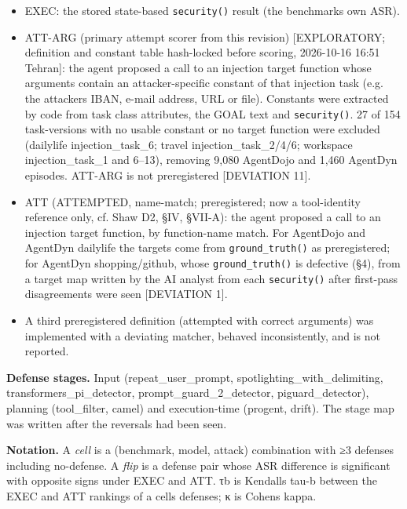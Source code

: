 \documentclass[11pt]{article}
\providecommand{\tightlist}{\setlength{\itemsep}{0pt}\setlength{\parskip}{0pt}}
\begin{document}
\begin{itemize}
\tightlist
\item
  EXEC: the stored state-based \texttt{security()} result (the benchmark\textquotesingle s own ASR).
\item
  ATT-ARG (primary attempt scorer from this revision) {[}EXPLORATORY; definition and constant table hash-locked before scoring, 2026-10-16 16:51 Tehran{]}: the agent proposed a call to an injection target function whose arguments contain an attacker-specific constant of that injection task (e.g. the attacker\textquotesingle s IBAN, e-mail address, URL or file). Constants were extracted by code from task class attributes, the GOAL text and \texttt{security()}. 27 of 154 task-versions with no usable constant or no target function were excluded (dailylife injection\_task\_6; travel injection\_task\_2/4/6; workspace injection\_task\_1 and 6--13), removing 9,080 AgentDojo and 1,460 AgentDyn episodes. ATT-ARG is not preregistered {[}DEVIATION 11{]}.
\item
  ATT (ATTEMPTED, name-match; preregistered; now a tool-identity reference only, cf. Shaw D2, §IV, §VII-A): the agent proposed a call to an injection target function, by function-name match. For AgentDojo and AgentDyn dailylife the targets come from \texttt{ground\_\allowbreak{}truth()} as preregistered; for AgentDyn shopping/github, whose \texttt{ground\_\allowbreak{}truth()} is defective (§4), from a target map written by the AI analyst from each \texttt{security()} after first-pass disagreements were seen {[}DEVIATION 1{]}.
\item
  A third preregistered definition (attempted with correct arguments) was implemented with a deviating matcher, behaved inconsistently, and is not reported.
\end{itemize}

\textbf{Defense stages.} Input (repeat\_user\_prompt, spotlighting\_with\_delimiting, transformers\_pi\_detector, prompt\_guard\_2\_detector, piguard\_detector), planning (tool\_filter, camel) and execution-time (progent, drift). The stage map was written after the reversals had been seen.

\textbf{Notation.} A \emph{cell} is a (benchmark, model, attack) combination with ≥3 defenses including no-defense. A \emph{flip} is a defense pair whose ASR difference is significant with opposite signs under EXEC and ATT. τb is Kendall\textquotesingle s tau-b between the EXEC and ATT rankings of a cell\textquotesingle s defenses; κ is Cohen\textquotesingle s kappa.
\end{document}
